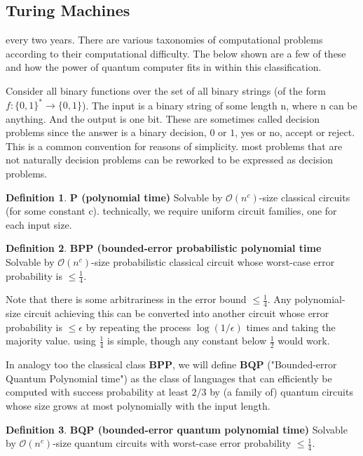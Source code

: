 \documentclass[12pt, oneside]{book}
\theoremstyle{definition}
\newtheorem{definition}{Definition}[section]
\theoremstyle{definition}
\theoremstyle{remark}
\begin{document}
\subsection{Turing Machines}
 

 every two years. There are various taxonomies of computational problems according to their computational difficulty. The below shown are a few of these and how the power of quantum computer fits in within this classification.

Consider all binary functions over the set of all binary strings (of the form $f:\{0,1\}^*\rightarrow \{0,1\}$). The input is a binary string of some length n, where n can be anything. And the output is one bit. These are sometimes called decision problems since the answer is a binary decision, $0$ or $1$, yes or no, accept or reject. This is a common convention for reasons of simplicity. most problems that are not naturally decision problems can be reworked to be expressed as decision problems.

\begin{definition}
    \textbf{P (polynomial time)} Solvable by $\mathcal{O}(n^c)$-size classical circuits (for some constant c). technically, we require uniform circuit families, one for each input size.
\end{definition}

\begin{definition}
    \textbf{BPP (bounded-error probabilistic polynomial time} Solvable by $\mathcal{O}(n^c)$-size probabilistic classical circuit whose worst-case error probability is $\leq \frac{1}{4}$.
\end{definition}
Note that there is some arbitrariness in the error bound $\leq \frac{1}{4}$. Any polynomial-size circuit achieving this can be converted into another circuit whose error probability is $\leq \epsilon$ by repeating the process $\log(1/\epsilon)$ times and taking the majority value. using $\frac{1}{4}$ is simple, though any constant below $\frac{1}{2}$ would work.

In analogy too the classical class $\mathbf{BPP}$, we will define $\mathbf{BQP}$ ("Bounded-error Quantum Polynomial time") as the class of languages that can efficiently be computed with success probability at least $2/3$ by (a family of) quantum circuits whose size grows at most polynomially with the input length.
\begin{definition}
    \textbf{BQP (bounded-error quantum polynomial time)} Solvable by $\mathcal{O}(n^c)$-size quantum circuits with worst-case error probability $\leq \frac{1}{4}$.
\end{definition}
\end{document}
